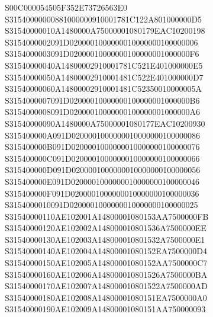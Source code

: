 \documentclass[12pt,a4paper]{article}
\begin{document}
\begin{framed}
 {\selectfont
S00C000054505F352E73726563E0\newline
S31540000000881000000910001781C122A801000000D5\newline
S31540000010A1480000A75000001080179EAC10200198\newline
S3154000002091D0200001000000010000000100000006\newline
S3154000003091D02000010000000100000001000000F6\newline
S31540000040A14800002910001781C521E401000000E5\newline
S31540000050A14800002910001481C522E401000000D7\newline
S31540000060A14800002910001481C52350010000005A\newline
S3154000007091D02000010000000100000001000000B6\newline
S3154000008091D02000010000000100000001000000A6\newline
S31540000090A1480000A75000001080177EAC10200930\newline
S315400000A091D0200001000000010000000100000086\newline
S315400000B091D0200001000000010000000100000076\newline
S315400000C091D0200001000000010000000100000066\newline
S315400000D091D0200001000000010000000100000056\newline
S315400000E091D0200001000000010000000100000046\newline
S315400000F091D0200001000000010000000100000036\newline
S3154000010091D0200001000000010000000100000025\newline
S31540000110AE102001A14800001080153AA7500000FB\newline
S31540000120AE102002A148000010801536A7500000EE\newline
S31540000130AE102003A148000010801532A7500000E1\newline
S31540000140AE102004A14800001080152EA7500000D4\newline
S31540000150AE102005A14800001080152AA7500000C7\newline
S31540000160AE102006A148000010801526A7500000BA\newline
S31540000170AE102007A148000010801522A7500000AD\newline
S31540000180AE102008A14800001080151EA7500000A0\newline
S31540000190AE102009A14800001080151AA750000093\newline
}
\end{framed}
\end{document}
